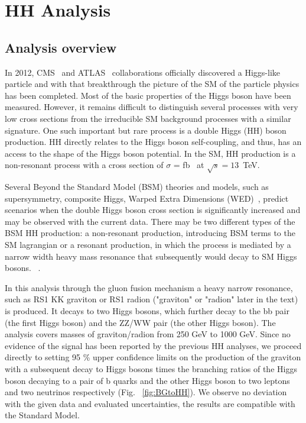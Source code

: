 \chapter{HH Analysis}
\section{Analysis overview}

\label{sec:an_overview}

In 2012, CMS~\cite{HiggsCMS} and
ATLAS~\cite{HiggsAtlas} collaborations officially discovered a Higgs-like particle and with that breakthrough the picture of the
SM \cite{Salam:1961en,Glashow:1961tr,Weinberg:1967tq}
of the particle physics has been completed. 
Most of the basic properties of the Higgs
boson have been measured. 
However, it remains difficult to distinguish several processes with very low
cross sections from the
irreducible SM background processes with a similar signature. 
One such important but rare process is a double Higgs (HH) boson
production. HH directly relates to the Higgs boson self-coupling, and thus,  
has an access to the shape of the Higgs boson potential. In the SM, HH
production is a non-resonant process with a cross section of $\sigma$
=  fb~\cite{HHXsec} at $\sqrt{s}=13$~TeV. 

Several Beyond the Standard
Model (BSM) theories and models, such as supersymmetry, composite Higgs, Warped Extra Dimensions (WED)~\cite{Dolan:2012ac, Huang:2017nnw, Kanemura:2016tan, Oliveira:2014kla, WED}, predict scenarios when the double Higgs boson
cross section is significantly increased and may be observed with the current data.
There may be two different types of the BSM HH production: a non-resonant production,
introducing BSM terms to the SM lagrangian or a resonant production,
in which the process is mediated by a narrow width heavy mass resonance that subsequently would decay to SM Higgs bosons. 
~\cite{WED}. %
\vspace{1em} %


In this analysis through the gluon fusion mechanism a heavy narrow
resonance, such as RS1 KK graviton or RS1 radion ("graviton" or "radion" later in the text) \cite{BG1,BG2,BG3} is produced. It decays to two Higgs bosons, which further decay to the bb pair (the first Higgs boson) and the ZZ/WW pair (the other Higgs boson). 
The analysis covers masses of graviton/radion from 250 GeV to 1000 GeV. Since no evidence of the signal has been reported by the previous HH analyses, we proceed directly to setting 95 \% upper confidence
limits on the production of the graviton with a subsequent
decay to Higgs bosons times the branching ratios of the Higgs
boson decaying to a pair of b quarks and the other Higgs boson to two
leptons and two neutrinos respectively (Fig. ~\ref{fig:BGtoHH}). We observe no deviation with the given data and
evaluated uncertainties, the results are compatible with the Standard
Model.


